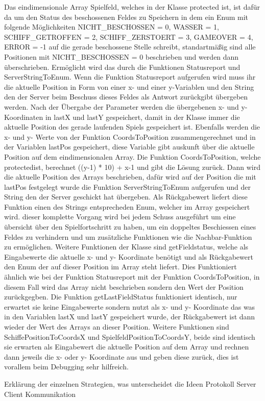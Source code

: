 Das eindimensionale Array Spielfeld, welches in der Klasse protected ist, ist dafür da um den Status des beschossenen Feldes zu Speichern in dem ein Enum mit folgende Möglichkeiten NICHT\_BESCHOSSEN = 0, WASSER = 1, SCHIFF\_GETROFFEN = 2, SCHIFF\_ZERSTOERT = 3, GAMEOVER = 4, ERROR = -1 auf die gerade beschossene Stelle schreibt, standartmäßig sind alle Positionen mit NICHT\_BESCHOSSEN = 0 beschrieben und werden dann überschrieben. Ermöglicht wird das durch die Funktionen Statusreport und ServerStringToEnum. Wenn die Funktion Statusreport aufgerufen wird muss ihr die aktuelle Position in Form von einer x- und einer y-Variablen und den String den der Server beim Beschuss dieses Feldes als Antwort zurückgibt übergeben werden. Nach der Übergabe der Parameter werden die übergebenen x- und y- Koordinaten in lastX und lastY gespeichert, damit in der Klasse immer die aktuelle Position des gerade laufenden Spiels gespeichert ist. Ebenfalls werden die x- und y- Werte von der Funktion CoordsToPosition zusammengerechnet und in der Variablen lastPos gespeichert, diese Variable gibt auskunft über die aktuelle Position auf dem eindimensionalen Array. Die Funktion CoordsToPosition, welche protectedist, berechnet ((y-1) * 10) + x-1 und gibt die Lösung zurück. Dann wird die aktuelle Position des Arrays beschrieben, dafür wird auf der Position die mit lastPos festgelegt wurde die Funktion ServerStringToEnum aufgerufen und der String den der Server geschickt hat übergeben. Als Rückgabewert liefert diese Funktion einen des Strings entsprecheden Enum, welcher im Array gespeichert wird. dieser komplette Vorgang wird bei jedem Schuss ausgeführt um eine übersicht über den Spielfortschritt zu haben, um ein doppeltes Beschiessen eines Feldes zu verhindern und um zusätzliche Funktionen wie die Nachbar-Funktion zu ermöglichen. Weitere Funktionen der Klasse sind getFieldstatus, welche als Eingabewerte die aktuelle x- und y- Koordinate benötigt und als Rückgabewert den Enum der auf dieser Position im Array steht liefert. Dies Funktioniert ähnlich wie bei der Funktion Statusreport mit der Funktion CoordsToPosition, in diesem Fall wird das Array nicht beschrieben sondern den Wert der Position zurückgegben. Die Funktion getLastFieldStatus funktioniert identisch, nur erwartet sie keine Eingabewerte sondern nutzt als x- und y- Koordinate das was in den Variablen lastX und lastY gespeichert wurde, der Rückgabewert ist dann wieder der Wert des Arrays an dieser Position. Weitere Funktionen sind SchiffePositionToCoordsX und SpielfeldPositionToCoordsY, beide sind identisch sie erwarten als Eingabewert die aktuelle Position auf dem Array und rechnen dann jeweils die x- oder y- Koordinate aus und geben diese zurück, dies ist vorallem beim Debugging sehr hilfreich.


Erklärung der einzelnen Strategien, was unterscheidet die Ideen
Protokoll Server Client Kommunikation